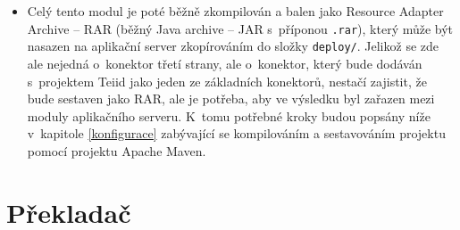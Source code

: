 \documentclass[oneside,12pt,final]{fithesis2}
\begin{document}
\begin{itemize}
 \texttt{MANIFEST.MF} obsahuje pouze závislosti resource adapteru. V~případě našeho konkrétního adapteru je to:
 \begin{Verbatim}[fontsize=\small]
Dependencies: org.jboss.teiid.common-core,
	    org.jboss.teiid.api,javax.api,
	    org.jboss.teiid.translator.simpledb.api
 \end{Verbatim}
 
 V~deployment descriptoru \texttt{ra.xml} definujeme hlavní třídu resource adapteru (tj. třída implementující rozhraní \texttt{Resource Adapter}), třídu implementující rozhraní \texttt{ManagedConnection\allowbreak Factory} a definujeme proměnné potřebné k~připojení k~SimpleDB (ID přístupového klíče a tajný klíč). 
 
 \item Celý tento modul je poté běžně zkompilován a balen jako Resource Adapter Archive -- RAR (běžný Java archive -- JAR s~příponou \texttt{.rar}), který může být nasazen na aplikační server zkopírováním do složky \texttt{deploy/}. Jelikož se zde ale nejedná o~konektor třetí strany, ale o~konektor, který bude dodáván s~projektem Teiid jako jeden ze základních konektorů, nestačí zajistit, že bude sestaven jako RAR, ale je potřeba, aby ve výsledku byl zařazen mezi moduly aplikačního serveru. K~tomu potřebné kroky budou popsány níže v~kapitole \ref{konfigurace} zabývající se kompilováním a sestavováním projektu pomocí projektu Apache Maven.
\end{itemize}

\section{Překladač}
\end{document}
